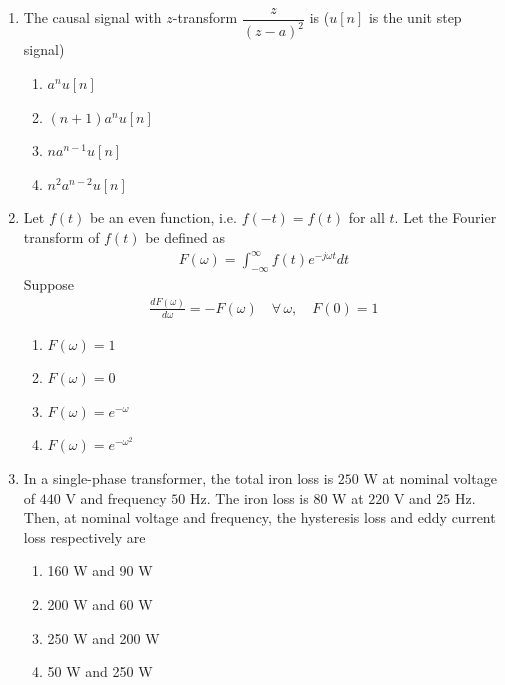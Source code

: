 \documentclass[journal,12pt,onecolumn]{IEEEtran}
\theoremstyle{remark}
\begin{document}
\begin{flushleft}
\begin{enumerate}
\item The causal signal with $z$-transform $\dfrac{z}{(z-a)^2}$ is  
($u[n]$ is the unit step signal)

\begin{multicols}{2}
\begin{enumerate}
    \item $a^n u[n]$
    \item $(n+1)a^n u[n]$
    \item $n a^{n-1}u[n]$
    \item $n^2 a^{n-2}u[n]$
\end{enumerate}
\end{multicols}


\item Let $f(t)$ be an even function, i.e. $f(-t) = f(t)$ for all $t$.  
Let the Fourier transform of $f(t)$ be defined as  
\begin{align*}
    F(\omega) = \int_{-\infty}^{\infty} f(t)e^{-j\omega t}dt
\end{align*}
Suppose  
\begin{align*}
    \frac{dF(\omega)}{d\omega} = -F(\omega)\quad \forall \, \omega,\quad F(0)=1
\end{align*}

\begin{multicols}{2}
\begin{enumerate}
    \item $F(\omega)=1$
    \item $F(\omega)=0$
    \item $F(\omega)=e^{-\omega}$
    \item $F(\omega)=e^{-\omega^2}$
\end{enumerate}
\end{multicols}

\item In a single-phase transformer, the total iron loss is $250$ W at nominal voltage of $440$ V and frequency $50$ Hz.  
The iron loss is $80$ W at $220$ V and $25$ Hz.  
Then, at nominal voltage and frequency, the hysteresis loss and eddy current loss respectively are

\begin{multicols}{2}
\begin{enumerate}
    \item 160 W and 90 W
    \item 200 W and 60 W
    \item 250 W and 200 W
    \item 50 W and 250 W
\end{enumerate}
\end{multicols}



\end{enumerate}
\end{flushleft}
\end{document}

